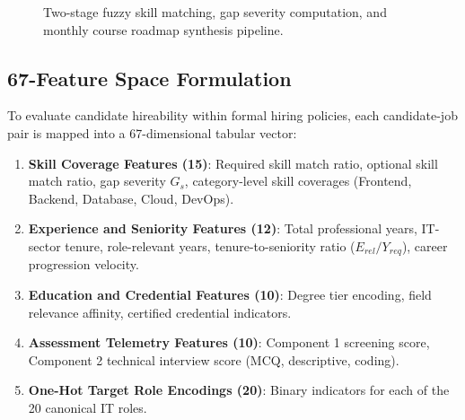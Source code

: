 \documentclass[conference]{IEEEtran}
\begin{document}
\begin{figure}[t]
\centering
{}
\caption{Two-stage fuzzy skill matching, gap severity computation, and monthly course roadmap synthesis pipeline.}
\label{fig:gap_pipeline}
\end{figure}

\subsection{67-Feature Space Formulation}
To evaluate candidate hireability within formal hiring policies, each candidate-job pair is mapped into a 67-dimensional tabular vector:
\begin{enumerate}
    \item \textbf{Skill Coverage Features (15)}: Required skill match ratio, optional skill match ratio, gap severity $G_s$, category-level skill coverages (Frontend, Backend, Database, Cloud, DevOps).
    \item \textbf{Experience and Seniority Features (12)}: Total professional years, IT-sector tenure, role-relevant years, tenure-to-seniority ratio ($E_{rel} / Y_{req}$), career progression velocity.
    \item \textbf{Education and Credential Features (10)}: Degree tier encoding, field relevance affinity, certified credential indicators.
    \item \textbf{Assessment Telemetry Features (10)}: Component 1 screening score, Component 2 technical interview score (MCQ, descriptive, coding).
    \item \textbf{One-Hot Target Role Encodings (20)}: Binary indicators for each of the 20 canonical IT roles.
\end{enumerate}
\end{document}
